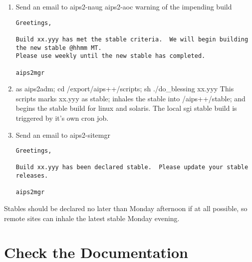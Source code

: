 \begin{enumerate}
\item Send an email to aips2-naug aips2-aoc warning of the impending build
\begin{verbatim}
Greetings,

Build xx.yyy has met the stable criteria.  We will begin building the new stable @hhmm MT.
Please use weekly until the new stable has completed.

aips2mgr

\end{verbatim}
\item as aips2adm; cd /export/aips++/scripts; sh ./do\_blessing xx.yyy
This scripts marks xx.yyy as stable; inhales the stable into /aips++/stable; and begins the stable
build for linux and solaris.  The local sgi stable build is triggered by it's own cron job.
\item Send an email to aips2-sitemgr
\begin{verbatim}
Greetings,

Build xx.yyy has been declared stable.  Please update your stable releases.

aips2mgr
\end{verbatim}
\end{enumerate}

Stables should be declared no later than Monday afternoon if at all possible, so remote sites can
inhale the latest stable Monday evening.
\section{Check the Documentation}
